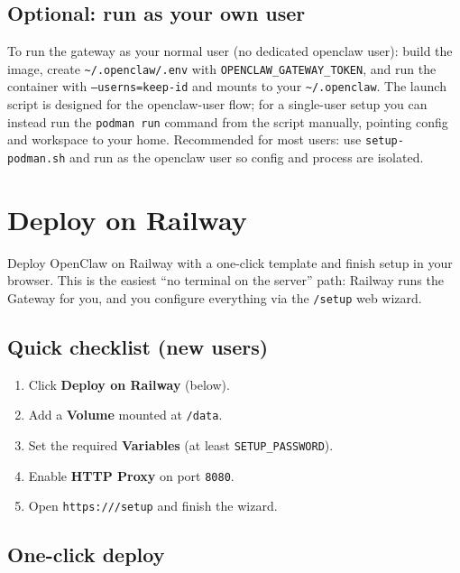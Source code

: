 \subsection{Optional: run as your own user}


To run the gateway as your normal user (no dedicated openclaw user): build the image, create \texttt{\textasciitilde{}/.openclaw/.env} with \texttt{OPENCLAW\_GATEWAY\_TOKEN}, and run the container with \texttt{--userns=keep-id} and mounts to your \texttt{\textasciitilde{}/.openclaw}. The launch script is designed for the openclaw-user flow; for a single-user setup you can instead run the \texttt{podman run} command from the script manually, pointing config and workspace to your home. Recommended for most users: use \texttt{setup-podman.sh} and run as the openclaw user so config and process are isolated.


\clearpage

\section{Deploy on Railway}

Deploy OpenClaw on Railway with a one-click template and finish setup in your browser.
This is the easiest “no terminal on the server” path: Railway runs the Gateway for you,
and you configure everything via the \texttt{/setup} web wizard.

\subsection{Quick checklist (new users)}


\begin{enumerate}
  \item Click \textbf{Deploy on Railway} (below).
  \item Add a \textbf{Volume} mounted at \texttt{/data}.
  \item Set the required \textbf{Variables} (at least \texttt{SETUP\_PASSWORD}).
  \item Enable \textbf{HTTP Proxy} on port \texttt{8080}.
  \item Open \texttt{https:///setup} and finish the wizard.
\end{enumerate}


\subsection{One-click deploy}


